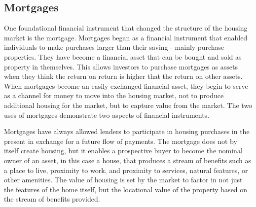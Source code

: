 



\subsection{Mortgages}
One foundational financial instrument that changed the structure of the housing market is the mortgage. 
Mortgages began as  a financial instrument that enabled individuals to make purchases larger than their saving - mainly  purchase properties.   They have become a financial asset that can be bought and sold as property in themselves. This allows investors to purchase mortgages as assets when they think the return on  return  is higher that the return on other assets.  When mortgages become an easily exchanged financial asset, they begin to serve as a channel for money to move into the housing market, not to produce additional housing for the market, but to capture value from the market. The two uses of mortgages demonstrate two aspects of financial instruments.  

Mortgages have always allowed lenders to participate in housing purchases in the present in exchange for a future flow of payments. The mortgage does not by itself create housing, but it enables a prospective buyer to become the nominal owner of an asset, in this case a house, that produces a stream of benefits such as a place to live, proximity to work, and proximity to services, natural features, or other amenities. The value of housing is set by the market to factor in not just the features of the home itself, but the locational value of the property based on the stream of benefits provided. 

